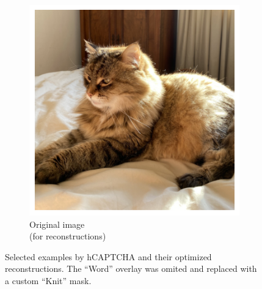 \documentclass[a4paper, oneside]{discothesis}
\begin{document}
\begin{figure}[th]
	\hfill
	\begin{subfigure}[t]{0.19\textwidth}\centering\includegraphics[width=\linewidth]{figures/hcaptcha-copy-original.png}\caption{Original image\\(for reconstructions)}\label{fig:subfig9}\end{subfigure}

	\caption{Selected examples by hCAPTCHA and their optimized reconstructions. The ``Word'' overlay was omited and replaced with a custom ``Knit'' mask.}
	\label{fig:hcaptchacombined}
\end{figure}
\end{document}
